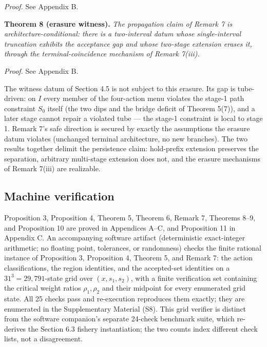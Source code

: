 \documentclass[3p,11pt]{elsarticle}
\begin{document}
\emph{Proof.} See Appendix B.

\textbf{Theorem 8 (erasure witness).} \emph{The propagation claim of
Remark 7 is architecture-conditional: there is a two-interval datum
whose single-interval truncation exhibits the acceptance gap and whose
two-stage extension erases it, through the terminal-coincidence
mechanism of Remark 7(iii).}

\emph{Proof.} See Appendix B.

The witness datum of Section 4.5 is not subject to this erasure. Its gap is
tube-driven: on \(I\) every member of the four-action menu violates the
stage-1 path constraint \(S_0\) itself (the two dips and the bridge
deficit of Theorem 5(7)), and a later stage cannot repair a violated
tube --- the stage-1 constraint is local to stage 1. Remark 7's safe
direction is secured by exactly the assumptions the erasure datum
violates (unchanged terminal architecture, no new branches). The two
results together delimit the persistence claim: hold-prefix extension
preserves the separation, arbitrary multi-stage extension does not, and
the erasure mechanisms of Remark 7(iii) are realizable.

\subsection{Machine verification}\label{machine-verification}

Proposition 3, Proposition 4, Theorem 5, Theorem 6, Remark 7, Theorems
8--9, and Proposition 10 are proved in Appendices A--C, and Proposition 11
in Appendix C. An accompanying software artifact (deterministic exact-integer arithmetic; no floating point, tolerances, or randomness) checks the finite rational instance of Proposition 3, Proposition 4, Theorem 5, and Remark 7: the action classifications, the region identities, and the accepted-set identities on a \(31^3 = 29{,}791\)-state grid over \((x, s_1, s_2)\), with a finite verification set containing the critical weight ratios \(\rho_1, \rho_2\) and their midpoint for every enumerated grid state. All 25 checks pass and re-execution reproduces them exactly; they are enumerated in the Supplementary Material (S8). This grid verifier is distinct from the software companion's separate 24-check benchmark suite, which re-derives the Section 6.3 fishery instantiation; the two counts index different check lists, not a disagreement.
\end{document}
